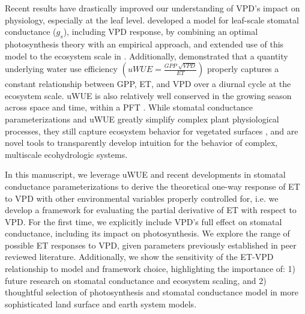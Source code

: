 Recent results have drastically improved our understanding of VPD's
impact on physiology, especially at the leaf
level. \citet{MEDLYN_2011} developed a model for leaf-scale stomatal
conductance ($g_s$), including VPD response, by combining an optimal
photosynthesis theory \citep{Cowan_1977} with an empirical approach,
and extended use of this model to the ecosystem scale in
\citet{Medlyn_2017}. Additionally, \citet{Zhou_2014} demonstrated that
a quantity underlying water use efficiency $\left(uWUE = \frac{GPP\;
\sqrt{VPD}}{ET}\right)$ properly captures a constant relationship
between GPP, ET, and VPD over a diurnal cycle at the ecosystem
scale. uWUE is also relatively well conserved in the growing season
across space and time, within a PFT \citep{Zhou_2015}. While stomatal
conductance parameterizations and uWUE greatly simplify complex plant
physiological processes, they still capture ecosystem behavior for
vegetated surfaces \citep{Medlyn_2017, Zhou_2014}, and are novel tools
to transparently develop intuition for the behavior of complex,
multiscale ecohydrologic systems.

In this manuscript, we leverage uWUE and recent developments in
stomatal conductance parameterizations \citep{MEDLYN_2011} to derive
the theoretical one-way response of ET to VPD with other environmental
variables properly controlled for, i.e. we develop a framework for
evaluating the partial derivative of ET with respect to VPD. For the
first time, we explicitly include VPD's full effect on stomatal
conductance, including its impact on photosynthesis. We explore the
range of possible ET responses to VPD, given parameters previously
established in peer reviewed literature. Additionally, we show the
sensitivity of the ET-VPD relationship to model and framework choice,
highlighting the importance of: 1) future research on stomatal
conductance and ecosystem scaling, and 2) thoughtful selection of
photosynthesis and stomatal conductance model in more sophisticated
land surface and earth system models.
